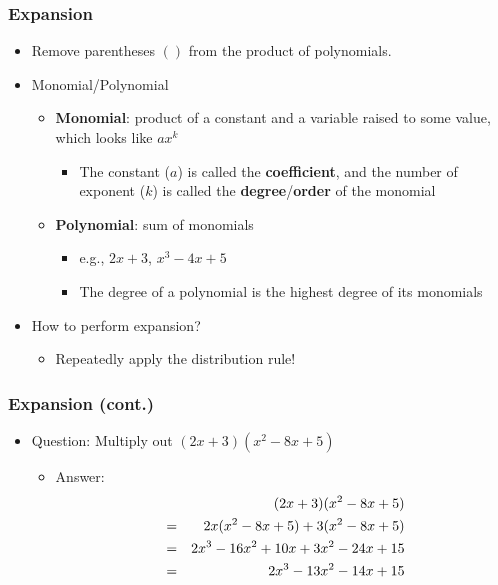 \documentclass[pdflatex, 12pt]{beamer}
\begin{document}
\begin{frame}
\frametitle{Expansion}
\begin{itemize}
\item Remove parentheses $()$ from the product of polynomials.
\vspace{0.4cm}
\item Monomial/Polynomial
 \begin{itemize}
 \item \textbf{Monomial}: product of a constant and a variable raised to some value, which looks like $ax^k$
  \begin{itemize}
  \item The constant ($a$) is called the \textbf{coefficient}, and the number of exponent ($k$) is called the \textbf{degree}/\textbf{order} of the monomial
  \end{itemize} 
 \item \textbf{Polynomial}: sum of monomials
  \begin{itemize}
  \item e.g., $2x + 3$, $x^3 - 4x + 5$
  \item The degree of a polynomial is the highest degree of its monomials 
  \end{itemize} 
 \end{itemize}
\item How to perform expansion?
 \begin{itemize}
 \item Repeatedly apply the distribution rule!
 \end{itemize}
\end{itemize}
\end{frame}

\begin{frame}
\frametitle{Expansion (cont.)}
\begin{itemize}
\item Question: Multiply out $(2x + 3)(x^2 - 8x + 5)$
\vspace{0.4cm}
 \begin{itemize}
 \item Answer:
 \begin{eqnarray}
 && (2x + 3)(x^2 - 8x + 5) \notag \\
 &=& 2x(x^2 - 8x + 5) + 3(x^2 - 8x + 5) \notag \\
 &=& 2x^3 - 16x^2 + 10x + 3x^2 - 24x + 15 \notag \\
 &=& 2x^3 - 13x^2 - 14x + 15 \notag
 \end{eqnarray}
 \end{itemize}
\end{itemize}
\end{frame}
\end{document}
